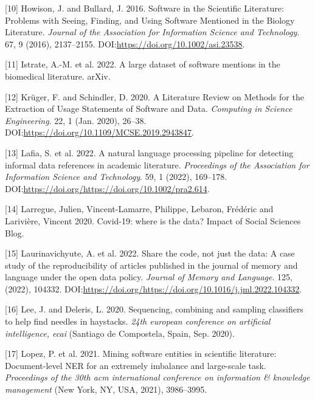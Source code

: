 \documentclass[
]{article}
\newenvironment{cslreferences}%
  {}%
  {\par}
\begin{document}
\begin{cslreferences}
\leavevmode\hypertarget{ref-howison_software_2016}{}%
{[}10{]} Howison, J. and Bullard, J. 2016. Software in the Scientific
Literature: Problems with Seeing, Finding, and Using Software Mentioned
in the Biology Literature. \emph{Journal of the Association for
Information Science and Technology}. 67, 9 (2016), 2137--2155.
DOI:\url{https://doi.org/10.1002/asi.23538}.

\leavevmode\hypertarget{ref-istrate_2022}{}%
{[}11{]} Istrate, A.-M. et al. 2022. A large dataset of software
mentions in the biomedical literature. arXiv.

\leavevmode\hypertarget{ref-kruger_literature_2020}{}%
{[}12{]} Krüger, F. and Schindler, D. 2020. A Literature Review on
Methods for the Extraction of Usage Statements of Software and Data.
\emph{Computing in Science Engineering}. 22, 1 (Jan. 2020), 26--38.
DOI:\url{https://doi.org/10.1109/MCSE.2019.2943847}.

\leavevmode\hypertarget{ref-10.1002ux2fpra2.614}{}%
{[}13{]} Lafia, S. et al. 2022. A natural language processing pipeline
for detecting informal data references in academic literature.
\emph{Proceedings of the Association for Information Science and
Technology}. 59, 1 (2022), 169--178.
DOI:\url{https://doi.org/https://doi.org/10.1002/pra2.614}.

\leavevmode\hypertarget{ref-Larregue_2020}{}%
{[}14{]} Larregue, Julien, Vincent-Lamarre, Philippe, Lebaron, Frédéric
and Larivière, Vincent 2020. Covid-19: where is the data? Impact of
Social Sciences Blog.

\leavevmode\hypertarget{ref-LAURINAVICHYUTE2022104332}{}%
{[}15{]} Laurinavichyute, A. et al. 2022. Share the code, not just the
data: A case study of the reproducibility of articles published in the
journal of memory and language under the open data policy. \emph{Journal
of Memory and Language}. 125, (2022), 104332.
DOI:\url{https://doi.org/https://doi.org/10.1016/j.jml.2022.104332}.

\leavevmode\hypertarget{ref-LeeDeleris:2020}{}%
{[}16{]} Lee, J. and Deleris, L. 2020. Sequencing, combining and
sampling classifiers to help find needles in haystacks. \emph{24th
european conference on artificial intelligence, ecai} (Santiago de
Compostela, Spain, Sep. 2020).

\leavevmode\hypertarget{ref-10.1145ux2f3459637.3481936}{}%
{[}17{]} Lopez, P. et al. 2021. Mining software entities in scientific
literature: Document-level NER for an extremely imbalance and
large-scale task. \emph{Proceedings of the 30th acm international
conference on information \& knowledge management} (New York, NY, USA,
2021), 3986--3995.


\end{cslreferences}
\end{document}
